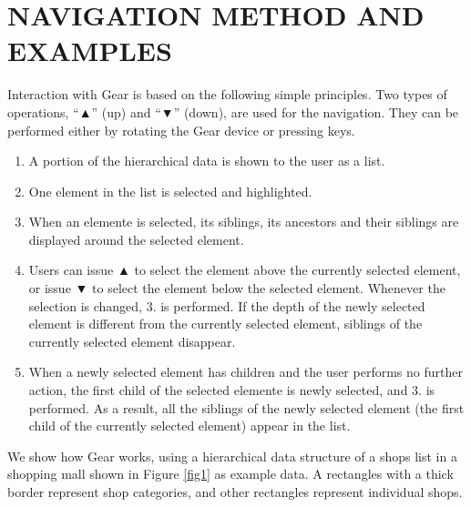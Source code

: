 \documentclass{article}
\def\up{▲}
\def\down{▼}
\begin{document}
\section*{NAVIGATION METHOD AND EXAMPLES}
\label{navigation}

Interaction with Gear is based on the following simple principles.
Two types of operations, ``{\up}'' (up) and ``{\down}'' (down), are used for the navigation.
They can be performed either by rotating the Gear device or pressing keys.

\begin{enumerate}
\item A portion of the hierarchical data is shown to the user as a list.

\item One element in the list is selected and highlighted.


\item When an elemente is selected, its siblings, its ancestors and their siblings are displayed
around the selected element.

\item Users can issue {\up} to select the element above the currently selected element,
or issue {\down} to select the element below the selected element.
Whenever the selection is changed, 3. is performed.
If the depth of the newly selected element is different from the currently
selected element, siblings of the currently selected element disappear.

\item When a newly selected element has children and the user performs no further action,
the first child of the selected elemente is newly selected, and 3. is performed.
As a result, all the siblings of the newly selected element
(the first child of the currently selected element) appear in the list.

\end{enumerate}

We show how Gear works, using a hierarchical data structure of
a shops list in a shopping mall shown in Figure \ref{fig1} as example data.
A rectangles with a thick border represent shop categories, and
other rectangles represent individual shops.
\end{document}
